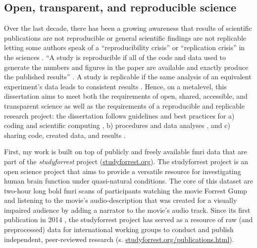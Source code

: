 \subsection{Open, transparent, and reproducible science}

Over the last decade, there has been a growing awareness that results of
scientific publications are not reproducible or general scientific findings are
not replicable letting some authors speak of a ``reproducibility crisis'' or
``replication crisis'' in the sciences \citep{baker2016reproducibility,
plesser2018reproducibility, stupple2019reproducibility, nosek2022replicability}.
``A study is reproducible if all of the code and data used to generate the
numbers and figures in the paper are available and exactly produce the published
results'' \citep{leek2017most}.
A study is replicable if the same analysis of an equivalent experiment's data
leads to consistent results \citep{dubois2016building, leek2017most}.
%
Hence, on a metalevel, this dissertation aims to meet both the requirements of
open, shared, accessible, and transparent science \citep[cf.][]{watson2015will,
fecher2014open} as well as the requirements of a reproducible and replicable
research project:
%
the dissertation follows guidelines and best practices for a) coding and
scientific computing \citep{wilson2014best}, b) procedures and data analyses
\citep{nichols2017best, poldrack2017scanning, poldrack2019establishment}, and c)
sharing code, created data, and results \citep{eglen2017toward, nichols2017best,
pernet2015improving}.

First, my work is built on top of publicly and freely available \ac{fmri} data
that are part of the \textit{studyforrest} project
(\href{www.studyforrest.org}{\url{studyforrest.org}}).
%
The studyforrest project is an open science project that aims to provide a
versatile resource for investigating human brain function under quasi-natural
conditions.
The core of this dataset are two-hour long \ac{bold} \ac{fmri} scans of
participants watching the movie Forrest Gump \citep{ForrestGumpMovie} and
listening to the movie's audio-description that was created for a visually
impaired audience by adding a narrator to the movie's audio track.
Since its first publication in 2014 \citep{hanke2014audiomovie}, the
studyforrest project has served as a resource of raw (and preprocessed) data for
international working groups to conduct and publish independent, peer-reviewed
research (s.
\href{www.studyforrest.org/publications.html}{\url{studyforrest.org/publications.html}}).

